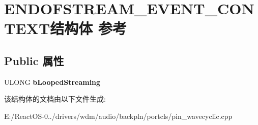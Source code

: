 \hypertarget{struct_e_n_d_o_f_s_t_r_e_a_m___e_v_e_n_t___c_o_n_t_e_x_t}{}\section{E\+N\+D\+O\+F\+S\+T\+R\+E\+A\+M\+\_\+\+E\+V\+E\+N\+T\+\_\+\+C\+O\+N\+T\+E\+X\+T结构体 参考}
\label{struct_e_n_d_o_f_s_t_r_e_a_m___e_v_e_n_t___c_o_n_t_e_x_t}
\subsection*{Public 属性}
\begin{DoxyCompactItemize}
\item 
\mbox{\label{struct_e_n_d_o_f_s_t_r_e_a_m___e_v_e_n_t___c_o_n_t_e_x_t_a9517ae9c2c884578a30ef96728dea9c9}} 
U\+L\+O\+NG {\bfseries b\+Looped\+Streaming}
\end{DoxyCompactItemize}


该结构体的文档由以下文件生成\+:\begin{DoxyCompactItemize}
\item 
E\+:/\+React\+O\+S-\/0../drivers/wdm/audio/backpln/portcls/pin\+\_\+wavecyclic.\+cpp\end{DoxyCompactItemize}
